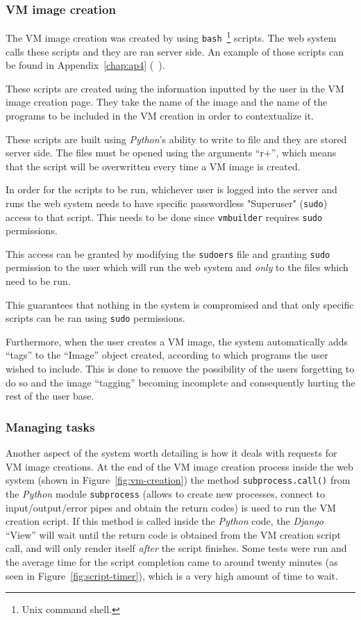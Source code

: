 \subsubsection{VM image creation}\label{subsubsec:vmcreation}

The VM image creation was created by using \texttt{bash}~\footnote{Unix command shell.} scripts. The web system calls these scripts and they are ran server side. An example of those scripts can be found in Appendix~\ref{chap:ap4} (~).

These scripts are created using the information inputted by the user in the VM image creation page. They take the name of the image and the name of the programs to be included in the VM creation in order to contextualize it. 

These scripts are built using \textit{Python}'s ability to write to file and they are stored server side. The files must be opened using the arguments ``r+'', which means that the script will be overwritten every time a VM image is created.

In order for the scripts to be run, whichever user is logged into the server and runs the web system needs to have specific passwordless "Superuser" (\texttt{sudo}) access to that script. This needs to be done since \texttt{vmbuilder} requires \texttt{sudo} permissions. 

This access can be granted by modifying the \texttt{sudoers} file and granting \texttt{sudo} permission to the user which will run the web system and \emph{only} to the files which need to be run.

This guarantees that nothing in the system is compromised and that only specific scripts can be ran using \texttt{sudo} permissions.

Furthermore, when the user creates a VM image, the system automatically adds ``tags'' to the ``Image'' object created, according to which programs the user wished to include. This is done to remove the possibility of the users forgetting to do so and the image ``tagging'' becoming incomplete and consequently hurting the rest of the user base.

\subsubsection{Managing tasks}

Another aspect of the system worth detailing is how it deals with requests for VM image creations. At the end of the VM image creation process inside the web system (shown in Figure~\ref{fig:vm-creation}) the method \texttt{subprocess.call()} from the \textit{Python} module \texttt{subprocess} (allows to create new processes, connect to input/output/error pipes and obtain the return codes) is used to run the VM creation script. If this method is called inside the \textit{Python} code, the \textit{Django} ``View'' will wait until the return code is obtained from the VM creation script call, and will only render itself \emph{after} the script finishes. Some tests were run and the average time for the script completion came to around twenty minutes (as seen in Figure~\ref{fig:script-timer}), which is a very high amount of time to wait.

